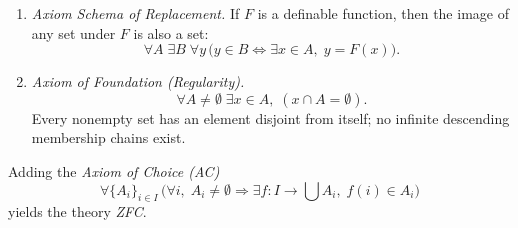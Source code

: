 \begin{enumerate}
    \item \textit{Axiom Schema of Replacement.}  
    If \(F\) is a definable function, then the image of any set under \(F\) is also a set:
    \[
    \forall A \; \exists B \; \forall y\, \big( y \in B \Leftrightarrow \exists x\in A,\; y = F(x) \big).
    \]

    \item \textit{Axiom of Foundation (Regularity).}  
    \[
    \forall A \neq \emptyset \; \exists x\in A,\; (x\cap A = \emptyset).
    \]
    Every nonempty set has an element disjoint from itself; no infinite descending membership chains exist.

\end{enumerate}

\begin{remark}
Adding the \textit{Axiom of Choice (AC)}
\[
\forall \{A_i\}_{i\in I} \, \Big( \forall i,\; A_i \neq \emptyset \Rightarrow \exists f : I \to \bigcup A_i, \; f(i)\in A_i \Big)
\]
yields the theory \textit{ZFC}.
\end{remark}

